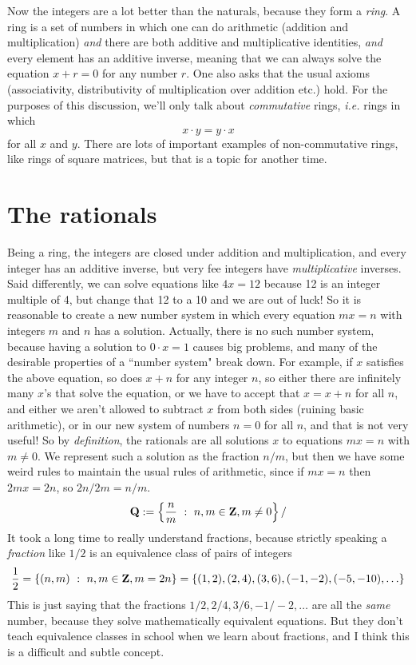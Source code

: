 \documentclass[11pt,oneside]{amsart}
\begin{document}
Now the integers are a lot better than the naturals, because they form a {\em ring}.  A ring is a set of numbers in which one can do arithmetic
(addition and multiplication) {\em and} there are both additive and multiplicative identities, {\em and} every element has an additive inverse,
meaning that we can always solve the equation $x+r = 0$ for any number $r$.  One also asks that the usual axioms (associativity, distributivity of
multiplication over addition etc.) hold.  For the purposes of this discussion, we'll only talk about {\em commutative} rings, {\em i.e.} rings in which
$$x\cdot y = y\cdot x$$
for all $x$ and $y$.  There are lots of important examples of non-commutative rings, like rings of square matrices, but that is a topic for another time.


\section{The rationals}

Being a ring, the integers are closed under addition and multiplication, and every integer has an additive inverse, but very fee integers
have {\em multiplicative} inverses.  Said differently, we can solve equations like $4x = 12$ because 12 is an integer multiple of 4, 
but change that 12 to a 10 and we are out of luck!  So it is reasonable to create a new number system in which every equation $mx=n$
with integers $m$ and $n$ has a solution.  Actually, there is no such number system, because having a solution to $0\cdot x = 1$
causes big problems, and many of the desirable properties of a ``number system" break down.  For example, if $x$ satisfies the above equation,
so does $x+n$ for any integer $n$, so either there are infinitely many $x$'s that solve the equation, or we have to accept that $x=x+n$ for all $n$,
and either we aren't allowed to subtract $x$ from both sides (ruining basic arithmetic), or in our new system of numbers $n=0$ for all $n$,
and that is not very useful!  So by {\em definition}, the rationals are all solutions $x$ to equations $mx=n$ with $m\neq 0$.  We
represent such a solution as the fraction $n/m$, but then we have some weird rules to maintain the usual rules of arithmetic,
since if $mx=n$ then $2mx = 2n$, so $2n/2m = n/m$.  
$$
	\mathbf{Q}:=\left\{\frac{n}{m}\ :\ n,m\in \mathbf{Z}, m\neq 0\right\}/
$$
It took a long time to really understand fractions, because strictly speaking a {\em fraction} like $1/2$ is an equivalence class of pairs of integers
$$
	\frac{1}{2} = \{ (n,m)\ :\ n,m\in \mathbf{Z}, m=2n \} = \{ (1,2), (2,4), (3,6), (-1,-2), (-5,-10),\ldots\}
$$
This is just saying that the fractions ${1/2}, 2/4, 3/6, -1/-2,\ldots$ are all the {\em same} number, because they solve mathematically equivalent
equations.  But they don't teach equivalence classes in school when we learn about fractions, and I think this is a difficult and subtle concept.
\end{document}
